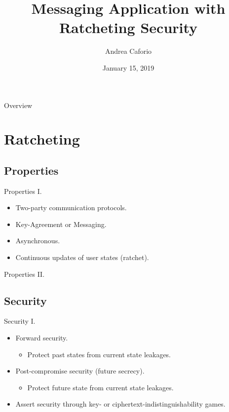 \documentclass{beamer}
\title{Messaging Application with Ratcheting Security}
\date{January 15, 2019}
\author{Andrea Caforio}
\institute{Ecole Polytechnique Fédérale de Lausanne}
\begin{document}
\maketitle

\begin{frame}{Overview}
\tableofcontents
\end{frame}

\section{Ratcheting}
\label{sec:ratcheting}

\subsection{Properties}
\label{sec:properties}

\begin{frame}{Properties I.}
  \begin{itemize}
  \item Two-party communication protocols.
  \item Key-Agreement or Messaging.
  \item Asynchronous.
  \item Continuous updates of user states (ratchet).
  \end{itemize}
\end{frame}

\begin{frame}{Properties II.}
  \begin{figure}
    \centering
     
  \end{figure}
\end{frame}

\subsection{Security}
\label{sec:security}

\begin{frame}{Security I.}
  \begin{itemize}
  \item Forward security.
    \begin{itemize}
    \item Protect past states from current state leakages.
    \end{itemize}
  \item Post-compromise security (future secrecy).
    \begin{itemize}
    \item Protect future state from current state leakages.
    \end{itemize}
  \item Assert security through key- or ciphertext-indistinguishability games.
  \end{itemize}
\end{frame}
\end{document}
